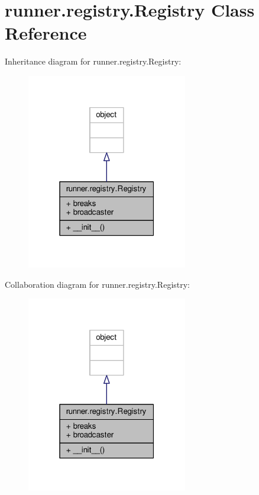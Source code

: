 \hypertarget{classrunner_1_1registry_1_1Registry}{}\section{runner.\+registry.\+Registry Class Reference}
\label{classrunner_1_1registry_1_1Registry}


Inheritance diagram for runner.\+registry.\+Registry\+:
\nopagebreak
\begin{figure}[H]
\begin{center}
\leavevmode
\includegraphics[width=199pt]{classrunner_1_1registry_1_1Registry__inherit__graph}
\end{center}
\end{figure}


Collaboration diagram for runner.\+registry.\+Registry\+:
\nopagebreak
\begin{figure}[H]
\begin{center}
\leavevmode
\includegraphics[width=199pt]{classrunner_1_1registry_1_1Registry__coll__graph}
\end{center}
\end{figure}
